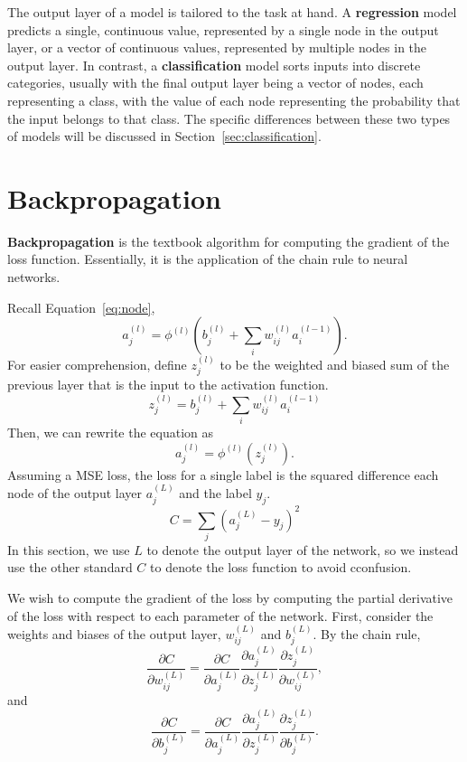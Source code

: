\documentclass[12pt]{report}
\theoremstyle{definition}
\theoremstyle{remark}
\begin{document}
The output layer of a model is tailored to the task at hand. A \textbf{regression} model predicts a single, continuous value, represented by a single node in the output layer, or a vector of continuous values, represented by multiple nodes in the output layer. In contrast, a \textbf{classification} model sorts inputs into discrete categories, usually with the final output layer being a vector of nodes, each representing a class, with the value of each node representing the probability that the input belongs to that class. The specific differences between these two types of models will be discussed in Section~\ref{sec:classification}.

\section{Backpropagation}

\textbf{Backpropagation} is the textbook algorithm for computing the gradient of the loss function. Essentially, it is the application of the chain rule to neural networks.

Recall Equation~\ref{eq:node},
\begin{equation}
    a^{(l)}_j = \phi^{(l)}\left(b_j^{(l)} + \sum_i w_{ij}^{(l)} a_i^{(l-1)}\right).
\end{equation}
For easier comprehension, define $z^{(l)}_j$ to be the weighted and biased sum of the previous layer that is the input to the activation function.
\begin{equation}\label{eq:weighted-sum}
    z^{(l)}_j = b_j^{(l)} + \sum_i w_{ij}^{(l)} a_i^{(l-1)}
\end{equation}
Then, we can rewrite the equation as
\begin{equation}\label{eq:simplified-node}
    a^{(l)}_j = \phi^{(l)}(z_j^{(l)}).
\end{equation}
Assuming a MSE loss, the loss for a single label is the squared difference each node of the output layer $a^{(L)}_j$ and the label $y_j$.
\begin{equation}
    C = \sum_j {(a^{(L)}_j - y_j)}^2
\end{equation}
In this section, we use $L$ to denote the output layer of the network, so we instead use the other standard $C$ to denote the loss function to avoid cconfusion.

We wish to compute the gradient of the loss by computing the partial derivative of the loss with respect to each parameter of the network. First, consider the weights and biases of the output layer, $w_{ij}^{(L)}$ and $b_j^{(L)}$. By the chain rule,
\begin{equation}\label{eq:chain-rule-weights}
    \frac{\partial C}{\partial w_{ij}^{(L)}} = \frac{\partial C}{\partial a_j^{(L)}} \frac{\partial a_j^{(L)}}{\partial z_j^{(L)}} \frac{\partial z_j^{(L)}}{\partial w_{ij}^{(L)}},
\end{equation}
and
\begin{equation}\label{eq:chain-rule-biases}
    \frac{\partial C}{\partial b_j^{(L)}} = \frac{\partial C}{\partial a_j^{(L)}} \frac{\partial a_j^{(L)}}{\partial z_j^{(L)}} \frac{\partial z_j^{(L)}}{\partial b_j^{(L)}}.
\end{equation}
\end{document}
